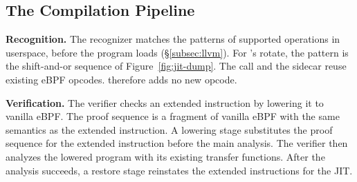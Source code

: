 \begin{figure}[t]
\label{fig:pipeline}
\end{figure}

\subsection{The Compilation Pipeline}
\label{subsec:pipeline}

\noindent\textbf{Recognition.}
The recognizer matches the patterns of supported operations in userspace, before the program loads (\S\ref{subsec:llvm}).
For \lang's rotate, the pattern is the shift-and-or sequence of Figure~\ref{fig:jit-dump}.
The call and the sidecar reuse existing eBPF opcodes.
\tool therefore adds no new opcode.

\noindent\textbf{Verification.}
The verifier checks an extended instruction by lowering it to vanilla eBPF.
The proof sequence is a fragment of vanilla eBPF with the same semantics as the extended instruction.
A lowering stage substitutes the proof sequence for the extended instruction before the main analysis.
The verifier then analyzes the lowered program with its existing transfer functions.
After the analysis succeeds, a restore stage reinstates the extended instructions for the JIT.

